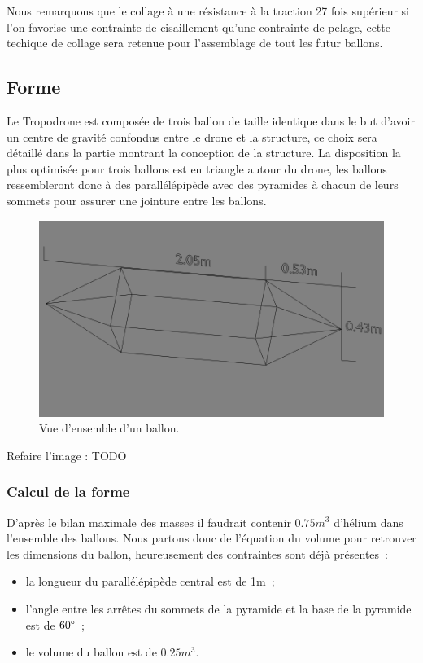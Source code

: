 \documentclass[a4paper,11pt]{article}
\begin{document}
Nous remarquons que le collage à une résistance à la traction 27 fois supérieur si l'on favorise une contrainte de cisaillement qu'une contrainte de pelage, cette techique de collage sera retenue pour l'assemblage de tout les futur ballons.

\subsection{Forme}

Le Tropodrone est composée de trois ballon de taille identique dans le but d'avoir un centre de gravité confondus entre le drone et la structure, ce choix sera détaillé dans la partie montrant la conception de la structure.
La disposition la plus optimisée pour trois ballons est en triangle autour du drone, les ballons ressembleront donc à des parallélépipède avec des pyramides à chacun de leurs sommets pour assurer une jointure entre les ballons.

\begin{figure}[H]
	\centering
 \includegraphics[width=12cm]{../Images/ballon.png}
 \caption{Vue d'ensemble d'un ballon.}
\end{figure}

Refaire l'image : TODO

\subsubsection{Calcul de la forme}

D'après le bilan maximale des masses il faudrait contenir $0.75m^3$ d'hélium dans l'ensemble des ballons. Nous partons donc de l'équation du volume pour retrouver les dimensions du ballon, heureusement des contraintes sont déjà présentes~:

\begin{itemize}
 \item la longueur du parallélépipède central est de 1m~;
 \item l'angle entre les arrêtes du sommets de la pyramide et la base de la pyramide est de $60 \degree$~;
 \item le volume du ballon est de $0.25m^3$.
\end{itemize}
\end{document}
